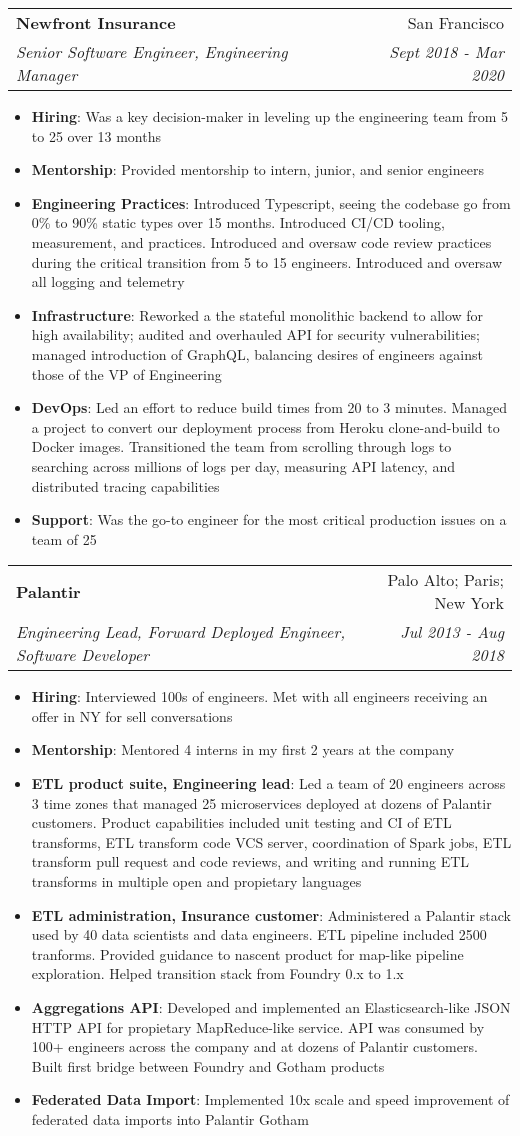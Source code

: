 \documentclass[letterpaper,11pt]{article}
\makeatletter
\newcommand{\resumeItem}[2]{
  \item\small{
    \textbf{#1}{: #2 \vspace{-2pt}}
  }
}
\newcommand{\resumeSubheading}[4]{
  \vspace{-1pt}\item
    \begin{tabular*}{0.97\textwidth}[t]{l@{\extracolsep{\fill}}r}
      \textbf{#1} & #2 \\
      \textit{\small#3} & \textit{\small #4} \\
    \end{tabular*}\vspace{-5pt}
}
\newcommand{\resumeItemListStart}{\begin{itemize}}
\newcommand{\resumeItemListEnd}{\end{itemize}\vspace{-5pt}}
\makeatother
\begin{document}
    \resumeSubheading
      {Newfront Insurance}{San Francisco}
      {Senior Software Engineer, Engineering Manager}{Sept 2018 - Mar 2020}
      \resumeItemListStart
        \resumeItem{Hiring}
          {Was a key decision-maker in leveling up the engineering team from 5 to 25 over 13 months}
        \resumeItem{Mentorship}
          {Provided mentorship to intern, junior, and senior engineers}
        \resumeItem{Engineering Practices}
          {Introduced Typescript, seeing the codebase go from 0\% to 90\% static types over 15 months.  Introduced CI/CD tooling, measurement, and practices.  Introduced and oversaw code review practices during the critical transition from 5 to 15 engineers.  Introduced and oversaw all logging and telemetry}
        \resumeItem{Infrastructure}
          {Reworked a the stateful monolithic backend to allow for high availability; audited and overhauled API for security vulnerabilities; managed introduction of GraphQL, balancing desires of engineers against those of the VP of Engineering}
        \resumeItem{DevOps}
          {Led an effort to reduce build times from 20 to 3 minutes. Managed a project to convert our deployment process from Heroku clone-and-build to Docker images. Transitioned the team from scrolling through logs to searching across millions of logs per day, measuring API latency, and distributed tracing capabilities}
        \resumeItem{Support}
          {Was the go-to engineer for the most critical production issues on a team of 25}
      \resumeItemListEnd

    \resumeSubheading
      {Palantir}{Palo Alto; Paris; New York}
      {Engineering Lead, Forward Deployed Engineer, Software Developer}{Jul 2013 - Aug 2018}
      \resumeItemListStart
        \resumeItem{Hiring}
          {Interviewed 100s of engineers.  Met with all engineers receiving an offer in NY for sell conversations}
        \resumeItem{Mentorship}
          {Mentored 4 interns in my first 2 years at the company}
        \resumeItem{ETL product suite, Engineering lead}
          {Led a team of 20 engineers across 3 time zones that managed 25 microservices deployed at dozens of Palantir customers.  Product capabilities included unit testing and CI of ETL transforms, ETL transform code VCS server, coordination of Spark jobs, ETL transform pull request and code reviews, and writing and running ETL transforms in multiple open and propietary languages}
        \resumeItem{ETL administration, Insurance customer}
          {Administered a Palantir stack used by 40 data scientists and data engineers.  ETL pipeline included 2500 tranforms.  Provided guidance to nascent product for map-like pipeline exploration.  Helped transition stack from Foundry 0.x to 1.x}
        \resumeItem{Aggregations API}
          {Developed and implemented an Elasticsearch-like JSON HTTP API for propietary MapReduce-like service.  API was consumed by 100+ engineers across the company and at dozens of Palantir customers.  Built first bridge between Foundry and Gotham products}
        \resumeItem{Federated Data Import}
          {Implemented 10x scale and speed improvement of federated data imports into Palantir Gotham}
      \resumeItemListEnd
      
\end{document}
